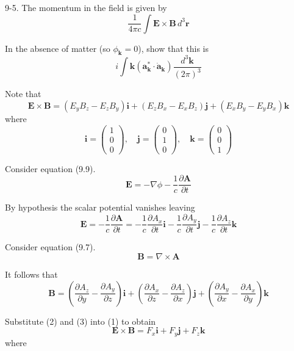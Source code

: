 \documentclass[12pt]{article}
\begin{document}
9-5.
The momentum in the field is given by
\begin{equation*}
\frac{1}{4\pi c}\int
\mathbf E\times\mathbf B\,d^3\mathbf r
\end{equation*}

In the absence of matter (so $\phi_{\mathbf k}=0$),
show that this is
\begin{equation*}
i\int\mathbf k\left(\mathbf a_{\mathbf k}^*\cdot\dot{\mathbf a}_{\mathbf k}\right)
\frac{d^3\mathbf k}{(2\pi)^3}
\end{equation*}

Note that
\begin{equation*}
\mathbf E\times\mathbf B
=(E_yB_z-E_zB_y)\mathbf i
+(E_zB_x-E_xB_z)\mathbf j
+(E_xB_y-E_yB_x)\mathbf k
\tag{1}
\end{equation*}
where
\begin{equation*}
\mathbf i=\begin{pmatrix}1\\0\\0\end{pmatrix},
\quad
\mathbf j=\begin{pmatrix}0\\1\\0\end{pmatrix},
\quad
\mathbf k=\begin{pmatrix}0\\0\\1\end{pmatrix}
\end{equation*}

Consider equation (9.9).
\begin{equation*}
\mathbf E=-\nabla\phi-\frac{1}{c}\frac{\partial\mathbf A}{\partial t}
\tag{9.9}
\end{equation*}

By hypothesis the scalar potential vanishes leaving
\begin{equation*}
\mathbf E=-\frac{1}{c}\frac{\partial\mathbf A}{\partial t}
=-\frac{1}{c}\frac{\partial A_x}{\partial t}\mathbf i
-\frac{1}{c}\frac{\partial A_y}{\partial t}\mathbf j
-\frac{1}{c}\frac{\partial A_z}{\partial t}\mathbf k
\tag{2}
\end{equation*}

Consider equation (9.7).
\begin{equation*}
\mathbf B=\nabla\times\mathbf A
\tag{9.7}
\end{equation*}

It follows that
\begin{equation*}
\mathbf B
=\left(\frac{\partial A_z}{\partial y}-\frac{\partial A_y}{\partial z}\right)\mathbf i
+\left(\frac{\partial A_x}{\partial z}-\frac{\partial A_z}{\partial x}\right)\mathbf j
+\left(\frac{\partial A_y}{\partial x}-\frac{\partial A_x}{\partial y}\right)\mathbf k
\tag{3}
\end{equation*}

Substitute (2) and (3) into (1) to obtain
\begin{equation*}
\mathbf E\times\mathbf B=F_x\mathbf i+F_y\mathbf j+F_z\mathbf k
\end{equation*}
where
\end{document}
